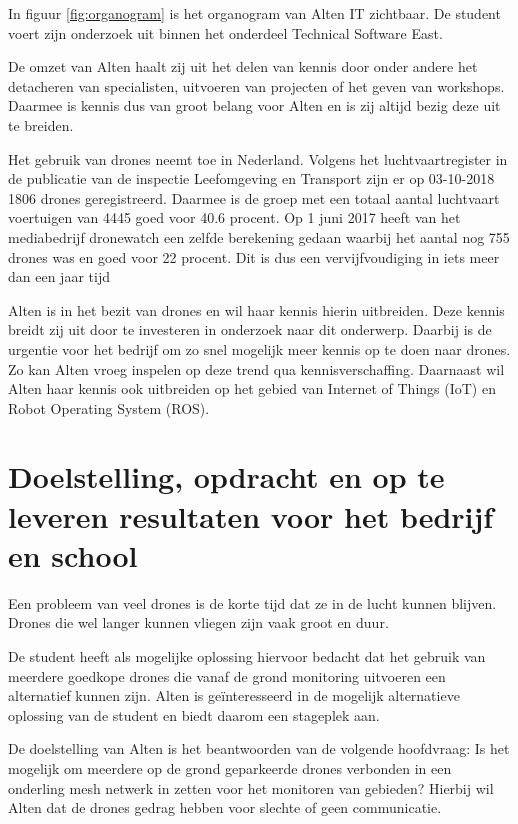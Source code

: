 \documentclass[a4paper, 11pt, oneside]{report}
\begin{document}
In figuur \ref{fig:organogram} is het organogram van Alten IT zichtbaar.
De student voert zijn onderzoek uit binnen het onderdeel Technical Software East.

De omzet van Alten haalt zij uit het delen van kennis door onder andere het detacheren van specialisten, uitvoeren van projecten of het geven van workshops.
Daarmee is kennis dus van groot belang voor Alten en is zij altijd bezig deze uit te breiden. 

Het gebruik van drones neemt toe in Nederland.
Volgens het luchtvaartregister in de publicatie van de inspectie Leefomgeving en Transport \cite{ILeT} zijn er op 03-10-2018 1806 drones geregistreerd. 
Daarmee is de groep met een totaal aantal luchtvaart voertuigen van 4445 goed voor 40.6 procent.
Op 1 juni 2017 heeft \citeauthor{aantalDrones} van het mediabedrijf dronewatch een zelfde berekening gedaan waarbij het aantal nog 755 drones was en goed voor 22 procent. Dit is dus een vervijfvoudiging in iets meer dan een jaar tijd

Alten is in het bezit van drones en wil haar kennis hierin uitbreiden.
Deze kennis breidt zij uit door te investeren in onderzoek naar dit onderwerp.
Daarbij is de urgentie voor het bedrijf om zo snel mogelijk meer kennis op te doen naar drones.
Zo kan Alten vroeg inspelen op deze trend qua kennisverschaffing.
Daarnaast wil Alten haar kennis ook uitbreiden op het gebied van Internet of Things (IoT) en Robot Operating System (ROS).

\chapter{Doelstelling, opdracht en op te leveren resultaten voor het bedrijf en school}
\label{chapter:doelstelling}

Een probleem van veel drones is de korte tijd dat ze in de lucht kunnen blijven.
Drones die wel langer kunnen vliegen zijn vaak groot en duur.

De student heeft als mogelijke oplossing hiervoor bedacht dat het gebruik van meerdere goedkope drones die vanaf de grond monitoring uitvoeren een alternatief kunnen zijn.
Alten is geïnteresseerd in de mogelijk alternatieve oplossing van de student en biedt daarom een stageplek aan.

De doelstelling van Alten is het beantwoorden van de volgende hoofdvraag: Is het mogelijk om meerdere op de grond geparkeerde drones verbonden in een onderling mesh netwerk in zetten voor het monitoren van gebieden?
Hierbij wil Alten dat de drones gedrag hebben voor slechte of geen communicatie.
\end{document}
